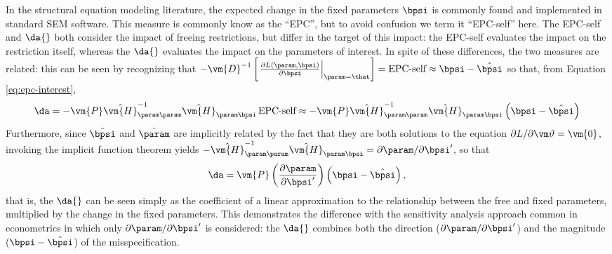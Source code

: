 In the structural equation modeling literature, the expected change in the fixed parameters $\bpsi$  is commonly found and implemented in standard SEM software. This measure is commonly know as the ``EPC'', but to avoid confusion we term it ``EPC-self'' here. The EPC-self and $\da{}$ both consider the impact of freeing restrictions, but differ in the target of this impact: the EPC-self evaluates the impact on the restriction itself, whereas the $\da{}$ evaluates the impact on the parameters of interest. In spite of these differences, the two measures are related: this can be seen by recognizing that $- \vm{D}^{-1}
		\left[ \left.\frac{\partial L(\param, \bpsi)}{\partial \bpsi}\right|_{\param = \that} \right] = \text{EPC-self} \approx \bpsi - \hat{\bpsi}$ so that, from Equation \ref{eq:epc-interest}, 
\begin{equation}
\da=- \vm{P} \hat{\vm{H}}^{-1}_{\param\param} \hat{\vm{H}}_{\param\bpsi} \,\text{EPC-self} \approx
- \vm{P} \hat{\vm{H}}^{-1}_{\param\param} \hat{\vm{H}}_{\param\bpsi} \left( \bpsi - \hat{\bpsi}\right)
\end{equation}
Furthermore, since $\hat{\bpsi}$ and $\hat{\param}$ are implicitly related by the fact that they are both solutions to the equation $\partial L / \partial \vm\vartheta = \vm{0}$, invoking the implicit function theorem yields $- \hat{\vm{H}}^{-1}_{\param\param} \hat{\vm{H}}_{\param\bpsi}  = \partial \param / \partial \bpsi^\prime$, so that 
\begin{equation}
	\da = \vm{P} \left( \frac{\partial \param} {\partial \bpsi^\prime} \right) \left( \bpsi - \hat{\bpsi}\right),
	\label{eq:epc-linear}
\end{equation}
that is, the $\da{}$ can be seen simply as the coefficient of a linear approximation to the relationship between the free and fixed parameters, multiplied by the change in the fixed parameters. This demonstrates the difference with the sensitivity analysis approach common in econometrics \citep[p. 168]{magnus2007local} in which only $\partial \param / \partial \bpsi^\prime$ is considered: the $\da{}$ combines both the direction ($\partial \param / \partial \bpsi^\prime$) and the magnitude ($ \bpsi - \hat{\bpsi}$) of the misspecification.


